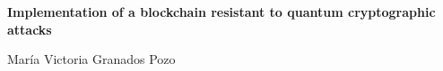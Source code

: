 \begin{center}
{\large\bfseries Implementation of a blockchain resistant to quantum cryptographic attacks}\\
\end{center}
\begin{center}
María Victoria Granados Pozo\\
\end{center}

\\

\vspace{0.7cm}
\\





